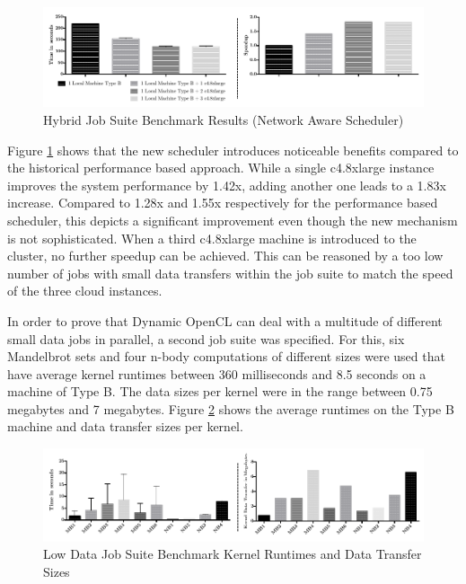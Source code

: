 \begin{figure}[!htb]
	\includegraphics[width=1.0\textwidth]{images/hybrid_full_benchmark_network_based.pdf}
	\centering
	\caption{Hybrid Job Suite  Benchmark Results (Network Aware Scheduler)}
	\label{img:hybrid_benchmark_results_network_aware}
\end{figure}

Figure \ref{img:hybrid_benchmark_results_network_aware} shows that the new scheduler introduces noticeable benefits compared to the historical performance based approach. While a single c4.8xlarge instance improves the system performance by 1.42x, adding another one leads to a 1.83x increase. Compared to 1.28x and 1.55x respectively for the performance based scheduler, this depicts a significant improvement even though the new mechanism is not sophisticated. When a third c4.8xlarge machine is introduced to the cluster, no further speedup can be achieved. This can be reasoned by a too low number of jobs with small data transfers within the job suite to match the speed of the three cloud instances.

In order to prove that Dynamic OpenCL can deal with a multitude of different small data jobs in parallel, a second job suite was specified. For this, six Mandelbrot sets and four n-body computations of different sizes were used that have average kernel runtimes between 360 milliseconds and 8.5 seconds on a machine of Type B. The data sizes per kernel were in the range between 0.75 megabytes and 7 megabytes. Figure \ref{img:low_data_benchmark_statistics} shows the average runtimes on the Type B machine and data transfer sizes per kernel.

\begin{figure}[!htb]
	\includegraphics[width=1.0\textwidth]{images/lowdata_benchmark_statistics.pdf}
	\centering
	\caption{Low Data Job Suite Benchmark Kernel Runtimes and Data Transfer Sizes}
	\label{img:low_data_benchmark_statistics}
\end{figure}

